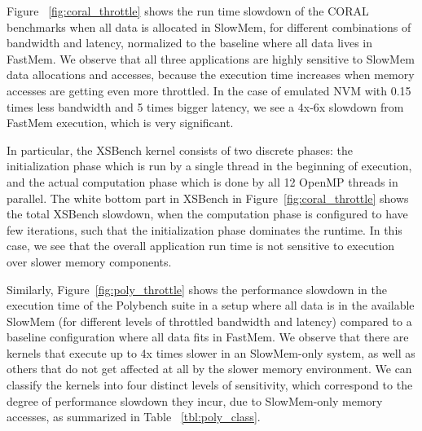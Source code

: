 \vspace{0.6ex}
{}
\vspace{0.3ex}

\noindent Figure ~\ref{fig:coral_throttle} shows the run time slowdown of the CORAL benchmarks when all data is allocated in SlowMem, for different combinations of bandwidth and latency, normalized to the baseline where all data lives in FastMem. We observe 
that all three applications are highly sensitive to SlowMem data allocations and accesses,  because the execution time increases when memory accesses are getting even more throttled. In the case of emulated NVM with 0.15 times less bandwidth and 5 times bigger latency, we see a 4x-6x slowdown from FastMem execution, which is very significant. 

In particular, the XSBench kernel consists of two discrete phases: the initialization phase which is run by a single thread in the beginning of execution, and the actual computation phase which is done by all 12 OpenMP threads in parallel. 
The white bottom part in XSBench in Figure~\ref{fig:coral_throttle} shows the total XSBench slowdown, when the computation phase is configured to have few iterations, such that the initialization phase dominates the runtime. In this case, we see that the overall application run time is not sensitive to execution over slower memory components. 



\vspace{2.0ex}

{}
\vspace{0.3ex}

\noindent Similarly, Figure~\ref{fig:poly_throttle} shows the performance slowdown in the execution time of the Polybench suite in a setup where all data is in the available SlowMem  
(for different levels of throttled bandwidth and latency) compared to 
a baseline configuration where all data fits in FastMem.  We observe that there are kernels that 
execute up to 4x times slower in an SlowMem-only system, 
as well as others that do not get affected at all by the slower memory environment. We can classify the kernels into four distinct levels of 
sensitivity, which correspond to the degree of performance slowdown they incur, due to SlowMem-only memory accesses, as summarized in Table ~\ref{tbl:poly_class}. \\

